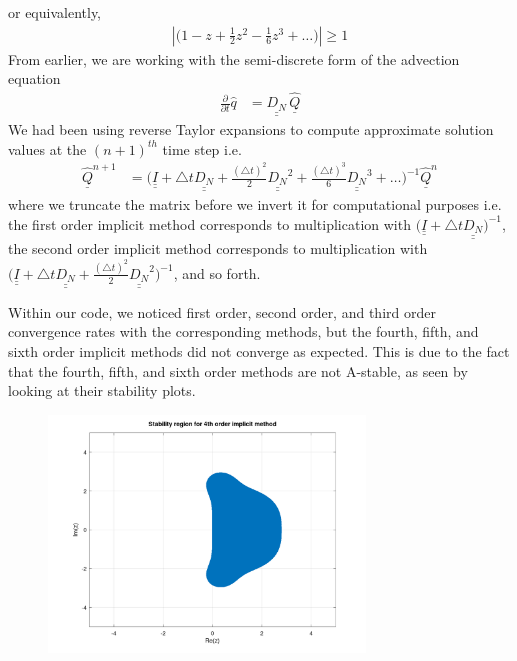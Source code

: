 \documentclass[12pt]{article}
\newcommand{\bunderline}[1]{\underline{#1}}
\renewcommand{\vec}[1]{{\bunderline{#1}}}
\newcommand{\mat}[1]{{\bunderline{\bunderline{#1}}}}
\begin{document}
or equivalently,
\begin{align*}
	\left\lvert \Bigg( 1 - z  + \frac{1}{2} z^{2} - \frac{1}{6} z^{3} + \hdots \Bigg) \right\rvert \geq 1
\end{align*}
From earlier, we are working with the semi-discrete form of the advection equation
\begin{align*}
	\frac{\partial}{\partial t} \hat{q} & = \mat{D_{N}} \, \vec{\hat{Q}}
\end{align*} 
We had been using reverse Taylor expansions to compute approximate solution values at the $(n+1)^{th}$ time step i.e.
\begin{align*}
	\vec{\hat{Q}}^{n+1} & = \Bigg( \mat{I} + \triangle t \mat{D_{N}} 
										   + \frac{(\triangle t)^{2}}{2} \mat{D_{N}}^{2} 
										   + \frac{(\triangle t)^{3}}{6} \mat{D_{N}}^{3}
										   + \hdots \Bigg)^{-1} \vec{\hat{Q}}^{n}
\end{align*}
where we truncate the matrix before we invert it for computational purposes i.e. the first order implicit method corresponds to multiplication with $\Bigg( \mat{I} + \triangle t \mat{D_{N}} \Bigg)^{-1}$, the second order implicit method corresponds to multiplication with $\Bigg( \mat{I} + \triangle t \mat{D_{N}} + \frac{(\triangle t)^{2}}{2} \mat{D_{N}}^{2} \Bigg)^{-1}$, and so forth.
\par 
Within our code, we noticed first order, second order, and third order convergence rates with the corresponding methods, but the fourth, fifth, and sixth order implicit methods did not converge as expected. 
This is due to the fact that the fourth, fifth, and sixth order methods are not A-stable, as seen by looking at their stability plots.
\begin{figure}[H]
	\centering
	\includegraphics[width=0.75\textwidth]{fourth_order_stab_region.png}
\end{figure}
\end{document}
